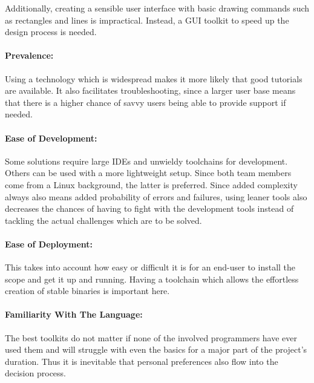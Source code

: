 Additionally, creating a  sensible user interface with  basic drawing commands
such as rectangles  and lines is impractical. Instead, a GUI  toolkit to speed
up the design process is needed.

\paragraph{Prevalence:} Using a  technology which is widespread  makes it more
likely that good tutorials are available. It also facilitates troubleshooting,
since a larger  user base means that  there is a higher chance  of savvy users
being able to provide support if needed.

\paragraph{Ease  of  Development:} Some  solutions   require  large  IDEs  and
unwieldy  toolchains  for   development. Others  can  be  used   with  a  more
lightweight  setup. Since both  team  members come  from  a Linux  background,
the  latter  is preferred. Since  added  complexity  always also  means  added
probability  of errors  and failures,  using leaner  tools also  decreases the
chances of having to fight with  the development tools instead of tackling the
actual challenges which are to be solved.

\paragraph{Ease of Deployment:} This takes into  account how easy or difficult
it is for an end-user to install the scope and get it up and running. Having a
toolchain which allows the effortless creation of stable binaries is important
here.

\paragraph{Familiarity With The Language:} The best  toolkits do not matter if
none of  the involved programmers have  ever used them and  will struggle with
even  the basics  for  a major  part  of the  project's  duration. Thus it  is
inevitable that personal preferences also flow into the decision process.

